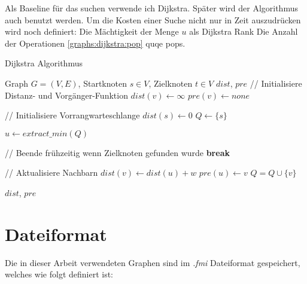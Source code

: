 Als Baseline für das suchen verwende ich Dijkstra.
Später wird der Algorithmus auch benutzt werden.
Um die Kosten einer Suche nicht nur in Zeit auszudrücken wird noch definiert:
Die Mächtigkeit der Menge $u$ als Dijkstra Rank
Die Anzahl der Operationen \ref{graphs:dijkstra:pop} quqe pops.



\begin{algorithm}[ht]
    \caption{Dijkstra Algorithmus}
    \begin{algorithmic}[1]
        \Require Graph $G = (V, E)$, Startknoten $s \in V$, Zielknoten $t \in V$
        \Ensure ${dist}$, ${pre}$
        \State // Initialisiere Distanz- und Vorgänger-Funktion
        \State ${dist}(v) \leftarrow \infty$
        \State ${pre}(v) \leftarrow {none}$
        \EndFor


        \State
        \State // Initialisiere Vorrangwarteschlange
        \State ${dist}(s) \leftarrow 0$
        \State $Q\leftarrow \{ s \}$

        \State
        \State $u \leftarrow{extract\_min}(Q)$\label{graphs:dijkstra:pop}

        \State
        \State // Beende frühzeitig wenn Zielknoten gefunden wurde
        \State \textbf{break}
        \EndIf

        \State
        \State // Aktualisiere Nachbarn
        \State ${dist}(v) \leftarrow {dist}(u) + w$
        \State ${pre}(u) \leftarrow v$
        \State $Q = Q \cup \{ v \}$
        \EndIf
        \EndFor

        \EndWhile

        \State
        \State \Return ${dist}$, ${pre}$
    \end{algorithmic}
\end{algorithm}


\section{Dateiformat}

Die in dieser Arbeit verwendeten Graphen sind im \emph{.fmi} Dateiformat gespeichert, welches wie folgt definiert ist:

